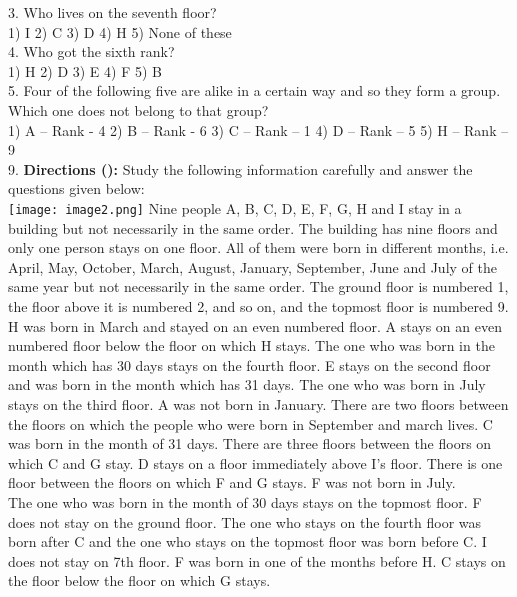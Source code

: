 \documentclass[
]{article}
\begin{document}
3. Who lives on the seventh floor?\\
1) I \hspace{2mm}2) C \hspace{2mm}3) D \hspace{2mm}4) H \hspace{2mm}5) None of these\\

4. Who got the sixth rank?\\
1) H \hspace{2mm}2) D \hspace{2mm}3) E \hspace{2mm}4) F \hspace{2mm}5) B\\

5. Four of the following five are alike in a certain way and so they form a group. Which
one does not belong to that group?\\
1) A – Rank - 4 \hspace{2mm}2) B – Rank - 6 \hspace{2mm}3) C – Rank – 1
\hspace{2mm}4) D – Rank – 5 \hspace{2mm}5) H – Rank – 9\\

9. \textbf{Directions ():} Study the following information carefully and answer the questions given
below:\\
\texttt{[image: image2.png]}
Nine people A, B, C, D, E, F, G, H and I stay in a building but not necessarily in the same
order. The building has nine floors and only one person stays on one floor. All of them were
born in different months, i.e. April, May, October, March, August, January, September, June
and July of the same year but not necessarily in the same order. The ground floor is
numbered 1, the floor above it is numbered 2, and so on, and the topmost floor is numbered
9. H was born in March and stayed on an even numbered floor. A stays on an even
numbered floor below the floor on which H stays. The one who was born in the month
which has 30 days stays on the fourth floor. E stays on the second floor and was born in the
month which has 31 days. The one who was born in July stays on the third floor. A was not
born in January. There are two floors between the floors on which the people who were
born in September and march lives. C was born in the month of 31 days. There are three
floors between the floors on which C and G stay. D stays on a floor immediately above I's
floor. There is one floor between the floors on which F and G stays. F was not born in July.\\
The one who was born in the month of 30 days stays on the topmost floor. F does not stay
on the ground floor. The one who stays on the fourth floor was born after C and the one
who stays on the topmost floor was born before C. I does not stay on 7th floor. F was born in
one of the months before H. C stays on the floor below the floor on which G stays.\\
\end{document}
